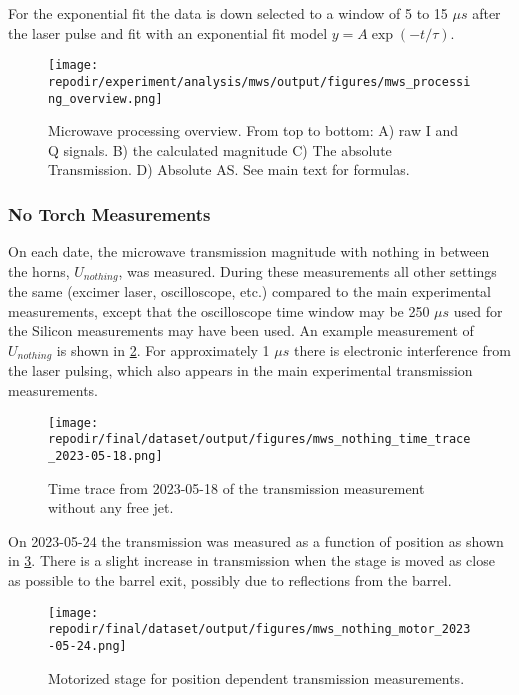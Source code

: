 For the exponential fit the data is down selected to a window of 5 to 15 $\mu s$ after the laser pulse and fit with an exponential fit model $y = A \exp(-t/\tau) $.


\begin{figure}[]
\centering
\texttt{[image: \\repodir/experiment/analysis/mws/output/figures/mws\_processing\_overview.png]}
\caption{Microwave processing overview. From top to bottom: A) raw I and Q signals. B) the calculated magnitude C) The absolute Transmission. D) Absolute AS. See main text for formulas.  }
\label{fig:SI_mws_processing_overview}
\end{figure}


\subsubsection{No Torch Measurements}

On each date, the microwave transmission magnitude with nothing in between the horns, $U_{nothing}$, was measured. During these measurements all other settings the same (excimer laser, oscilloscope, etc.) compared to the main experimental measurements, except that the oscilloscope time window may be 250 $\mu s$ used for the Silicon measurements may have been used. An example measurement of $U_{nothing}$ is shown in \ref{fig:SI_MWS_nothing_time_trace}. For approximately 1 $\mu s$ there is electronic interference from the laser pulsing, which also appears in the main experimental transmission measurements. 



\begin{figure}[]
\centering
\texttt{[image: \\repodir/final/dataset/output/figures/mws\_nothing\_time\_trace\_2023-05-18.png]}
\caption{Time trace from 2023-05-18 of the transmission measurement without any free jet.}
\label{fig:SI_MWS_nothing_time_trace}
\end{figure}

On 2023-05-24 the transmission was measured as a function of position as shown in \ref{fig:SI_MWS_nothing_motor}. There is a slight increase in transmission when the stage is moved as close as possible to the barrel exit, possibly due to reflections from the barrel.


\begin{figure}
\centering
\texttt{[image: \\repodir/final/dataset/output/figures/mws\_nothing\_motor\_2023-05-24.png]}
\caption{Motorized stage for position dependent transmission measurements.}
\label{fig:SI_MWS_nothing_motor}
\end{figure}


